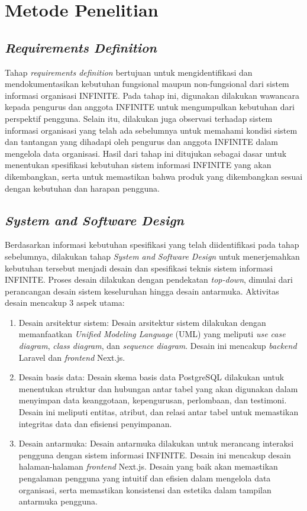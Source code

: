 \section{Metode Penelitian}

\subsection{\textit{Requirements Definition}}

Tahap \textit{requirements definition} bertujuan untuk mengidentifikasi dan mendokumentasikan kebutuhan fungsional maupun non-fungsional dari sistem informasi organisasi INFINITE. Pada tahap ini, digunakan dilakukan wawancara kepada pengurus dan anggota INFINITE untuk mengumpulkan kebutuhan dari perspektif pengguna. Selain itu, dilakukan juga observasi terhadap sistem informasi organisasi yang telah ada sebelumnya untuk memahami kondisi sistem dan tantangan yang dihadapi oleh pengurus dan anggota INFINITE dalam mengelola data organisasi. Hasil dari tahap ini ditujukan sebagai dasar untuk menentukan spesifikasi kebutuhan sistem informasi INFINITE yang akan dikembangkan, serta untuk memastikan bahwa produk yang dikembangkan sesuai dengan kebutuhan dan harapan pengguna.

\subsection{\textit{System and Software Design}}

Berdasarkan informasi kebutuhan spesifikasi yang telah diidentifikasi pada tahap sebelumnya, dilakukan tahap \textit{System and Software Design} untuk menerjemahkan kebutuhan tersebut menjadi desain dan spesifikasi teknis sistem informasi INFINITE. Proses desain dilakukan dengan pendekatan \textit{top-down}, dimulai dari perancangan desain sistem keseluruhan hingga desain antarmuka. Aktivitas desain mencakup 3 aspek utama:
\begin{enumerate}[label=\alph*.]
	\item Desain arsitektur sistem: Desain arsitektur sistem dilakukan dengan memanfaatkan \textit{Unified Modeling Language} (UML) yang meliputi \textit{use case diagram}, \textit{class diagram}, dan \textit{sequence diagram}. Desain ini mencakup \textit{backend} Laravel dan \textit{frontend} Next.js.
	\item Desain basis data: Desain skema basis data PostgreSQL dilakukan untuk menentukan struktur dan hubungan antar tabel yang akan digunakan dalam menyimpan data keanggotaan, kepengurusan, perlombaan, dan testimoni. Desain ini meliputi entitas, atribut, dan relasi antar tabel untuk memastikan integritas data dan efisiensi penyimpanan.
	\item Desain antarmuka: Desain antarmuka dilakukan untuk merancang interaksi pengguna dengan sistem informasi INFINITE. Desain ini mencakup desain halaman-halaman \textit{frontend} Next.js. Desain yang baik akan memastikan pengalaman pengguna yang intuitif dan efisien dalam mengelola data organisasi, serta memastikan konsistensi dan estetika dalam tampilan antarmuka pengguna.
\end{enumerate}

